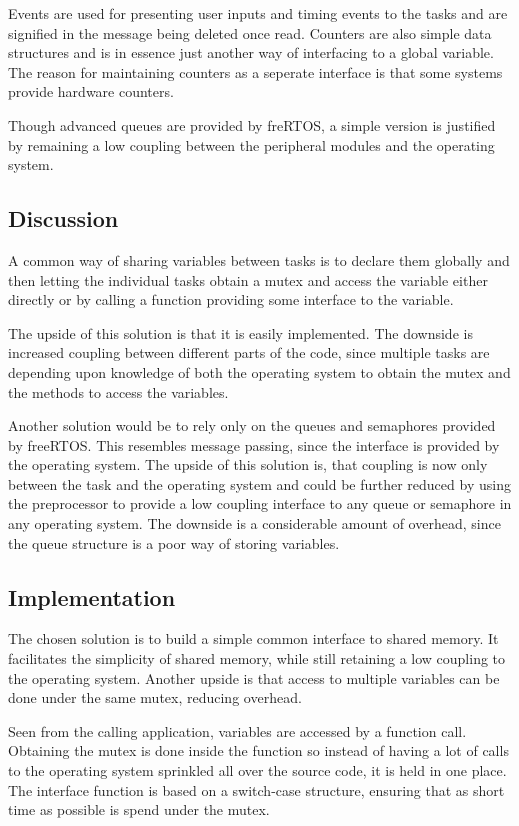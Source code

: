 Events are used for presenting user inputs and timing events to the tasks and
are signified in the message being deleted once read. Counters are also simple
data structures and is in essence just another way of interfacing to a global
variable. The reason for maintaining counters as a seperate interface is that
some systems provide hardware counters.

Though advanced queues are provided by freRTOS, a simple version is justified by
remaining a low coupling between the peripheral modules and the operating
system.

\subsection{Discussion}
A common way of sharing variables between tasks is to declare them globally and
then letting the individual tasks obtain a mutex and access the variable either
directly or by calling a function providing some interface to the variable.

The upside of this solution is that it is easily implemented. The downside is
increased coupling between different parts of the code, since multiple tasks are
depending upon knowledge of both the operating system to obtain the mutex and
the methods to access the variables.

Another solution would be to rely only on the queues and semaphores provided by
freeRTOS. This resembles message passing, since the interface is provided by the
operating system. The upside of this solution is, that coupling is now only
between the task and the operating system and could be further reduced by using
the preprocessor to provide a low coupling interface to any queue or semaphore
in any operating system. The downside is a considerable amount of overhead,
since the queue structure is a poor way of storing variables.

\subsection{Implementation}
The chosen solution is to build a simple common interface to shared memory. It
facilitates the simplicity of shared memory, while still retaining a low
coupling to the operating system. Another upside is that access to multiple
variables can be done under the same mutex, reducing overhead.

Seen from the calling application, variables are accessed by a function call.
Obtaining the mutex is done inside the function so instead of having a lot of
calls to the operating system sprinkled all over the source code, it is held in
one place. The interface function is based on a switch-case structure, ensuring
that as short time as possible is spend under the mutex.

